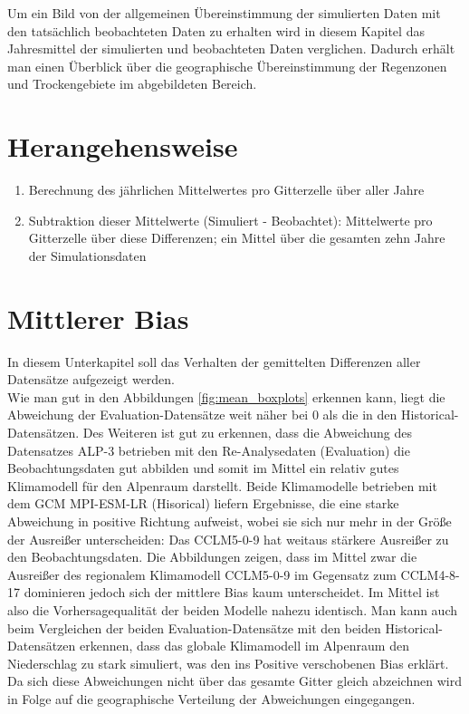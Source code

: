 Um ein Bild von der allgemeinen Übereinstimmung der simulierten Daten mit den tatsächlich beobachteten Daten zu erhalten wird in diesem Kapitel das Jahresmittel der simulierten und beobachteten Daten verglichen. Dadurch erhält man einen Überblick über die geographische Übereinstimmung der Regenzonen und Trockengebiete im abgebildeten Bereich.
\section{Herangehensweise}
\begin{enumerate}
	\item Berechnung des jährlichen Mittelwertes pro Gitterzelle über aller Jahre
	\item Subtraktion dieser Mittelwerte (Simuliert - Beobachtet): Mittelwerte pro Gitterzelle über diese Differenzen; ein Mittel über die gesamten zehn Jahre der Simulationsdaten	
\end{enumerate}
\section{Mittlerer Bias}
In diesem Unterkapitel soll das Verhalten der gemittelten Differenzen aller Datensätze aufgezeigt werden.\\
Wie man gut in den Abbildungen \ref{fig:mean_boxplots} erkennen kann, liegt die Abweichung der Evaluation-Datensätze weit näher bei 0 als die in den Historical-Datensätzen. Des Weiteren ist gut zu erkennen, dass die Abweichung des Datensatzes ALP-3 betrieben mit den Re-Analysedaten (Evaluation) die Beobachtungsdaten gut abbilden und somit im Mittel ein relativ gutes Klimamodell für den Alpenraum darstellt.
Beide Klimamodelle betrieben mit dem GCM MPI-ESM-LR (Hisorical) liefern Ergebnisse, die eine starke Abweichung in positive Richtung aufweist, wobei sie sich nur mehr in der Größe der Ausreißer unterscheiden: Das CCLM5-0-9 hat weitaus stärkere Ausreißer zu den Beobachtungsdaten. Die Abbildungen zeigen, dass im Mittel zwar die Ausreißer des regionalem Klimamodell CCLM5-0-9 im Gegensatz zum CCLM4-8-17 dominieren jedoch sich der mittlere Bias kaum unterscheidet. Im Mittel ist also die Vorhersagequalität der beiden Modelle nahezu identisch. Man kann auch beim Vergleichen der beiden Evaluation-Datensätze mit den beiden Historical-Datensätzen erkennen, dass das globale Klimamodell im Alpenraum den Niederschlag zu stark simuliert, was den ins Positive verschobenen Bias erklärt.\\
Da sich diese Abweichungen nicht über das gesamte Gitter gleich abzeichnen wird in Folge auf die geographische Verteilung der Abweichungen eingegangen.

